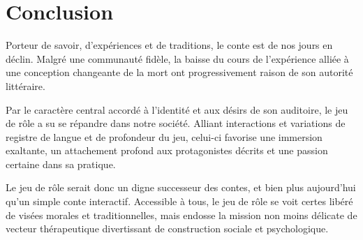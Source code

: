 \section*{Conclusion}

Porteur de savoir, d'expériences et de traditions, le conte est de nos jours en déclin. Malgré une communauté fidèle, la baisse du cours de l'expérience alliée à une conception changeante de la mort ont progressivement raison de son autorité littéraire.

Par le caractère central accordé à l'identité et aux désirs de son auditoire, le jeu de rôle a su se répandre dans notre société. Alliant interactions et variations de registre de langue et de profondeur du jeu, celui-ci favorise une immersion exaltante, un attachement profond aux protagonistes décrits et une passion certaine dans sa pratique.

Le jeu de rôle serait donc un digne successeur des contes, et bien plus aujourd'hui qu'un simple conte interactif. Accessible à tous, le jeu de rôle se voit certes libéré de visées morales et traditionnelles, mais endosse la mission non moins délicate de vecteur thérapeutique divertissant de construction sociale et psychologique.

\clearpage
